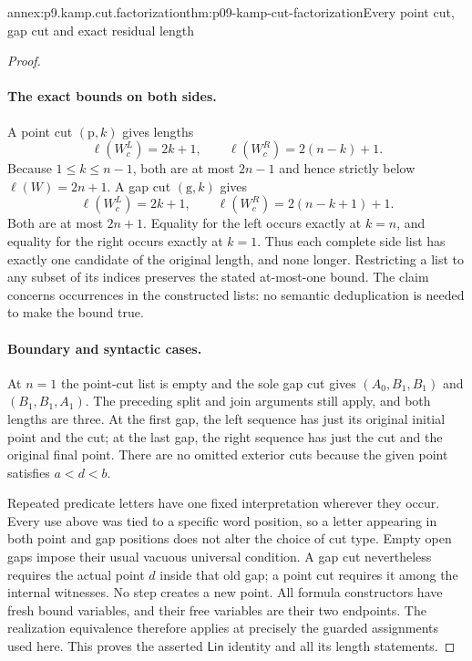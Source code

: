\begin{annexitem}{annex:p9.kamp.cut.factorization}{thm:p09-kamp-cut-factorization}{Every point cut, gap cut and exact residual length}
\begin{proof}
\paragraph{The exact bounds on both sides.}
A point cut \((\mathrm p,k)\) gives lengths
\[
              \ell(W_c^L)=2k+1,\qquad
              \ell(W_c^R)=2(n-k)+1.
\]
Because \(1\leq k\leq n-1\), both are at most \(2n-1\)
and hence strictly below \(\ell(W)=2n+1\).
A gap cut \((\mathrm g,k)\) gives
\[
              \ell(W_c^L)=2k+1,\qquad
              \ell(W_c^R)=2(n-k+1)+1.
\]
Both are at most \(2n+1\). Equality for the left occurs exactly
at \(k=n\), and equality for the right occurs exactly at
\(k=1\). Thus each complete side list has exactly one candidate
of the original length, and none longer. Restricting a list to any
subset of its indices preserves the stated at-most-one bound.
The claim concerns occurrences in the constructed lists: no semantic
deduplication is needed to make the bound true.

\paragraph{Boundary and syntactic cases.}
At \(n=1\) the point-cut list is empty and the sole gap cut
gives \((A_0,B_1,B_1)\) and \((B_1,B_1,A_1)\). The preceding
split and join arguments still apply, and both lengths are three.
At the first gap, the left sequence has just its original initial
point and the cut; at the last gap, the right sequence has just
the cut and the original final point. There are no omitted exterior
cuts because the given point satisfies \(a<d<b\).

Repeated predicate letters have one fixed interpretation wherever they
occur. Every use above was tied to a specific word position, so a
letter appearing in both point and gap positions does not alter the
choice of cut type. Empty open gaps impose their usual vacuous universal
condition. A gap cut nevertheless requires the actual point \(d\)
inside that old gap; a point cut requires it among the internal
witnesses. No step creates a new point. All formula constructors have
fresh bound variables, and their free variables are their two endpoints.
The realization equivalence therefore applies at precisely the guarded
assignments used here. This proves the asserted \(\mathsf{Lin}\)
identity and all its length statements.
\end{proof}
\end{annexitem}

